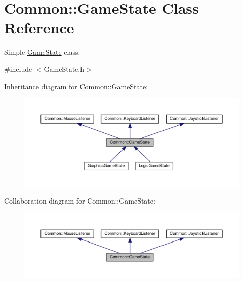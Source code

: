 \hypertarget{class_common_1_1_game_state}{}\section{Common\+:\+:Game\+State Class Reference}
\label{class_common_1_1_game_state}


Simple \hyperlink{class_common_1_1_game_state}{Game\+State} class.  




{\ttfamily \#include $<$Game\+State.\+h$>$}



Inheritance diagram for Common\+:\+:Game\+State\+:\nopagebreak
\begin{figure}[H]
\begin{center}
\leavevmode
\includegraphics[width=350pt]{class_common_1_1_game_state__inherit__graph}
\end{center}
\end{figure}


Collaboration diagram for Common\+:\+:Game\+State\+:\nopagebreak
\begin{figure}[H]
\begin{center}
\leavevmode
\includegraphics[width=350pt]{class_common_1_1_game_state__coll__graph}
\end{center}
\end{figure}
